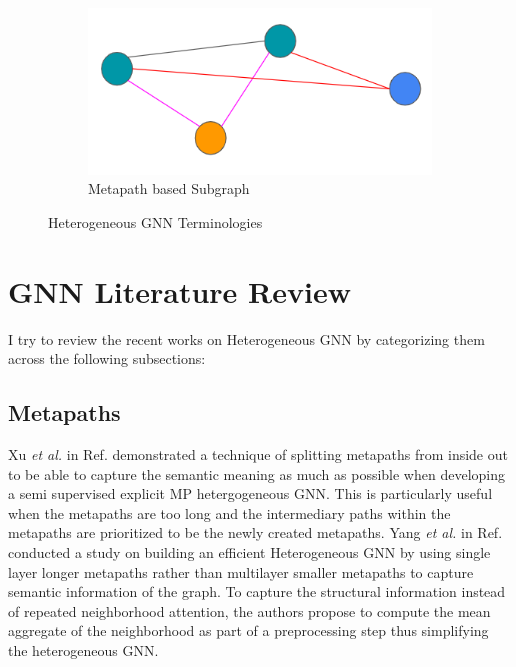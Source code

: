 \documentclass{report} %
\begin{document}
\begin{figure}[H]
    \begin{subfigure}{0.35\textwidth}
        \centering
        \includegraphics[width=\textwidth]{./ReportImages/Metasubgraph.png}
        \caption{Metapath based Subgraph}
        \label{fig:Metasubgraph}
    \end{subfigure}
    \caption{Heterogeneous \ac{GNN} Terminologies}
    \label{fig:Heterogeneous GNN Terminologies}
\end{figure}

\section{GNN Literature Review}\label{sec:HGNN Literature Review}
I try to review the recent works on Heterogeneous \ac{GNN} by categorizing them across the following subsections:

\subsection{Metapaths}\label{subsec:HGNN Metapaths}
Xu \textit{et al.} in Ref. \cite{EMPHGNN-2023} demonstrated a technique of splitting metapaths from inside out to be able to capture the semantic meaning as much as 
possible when developing a semi supervised explicit \ac{MP} hetergogeneous \ac{GNN}. This is particularly useful when the metapaths are too long and the 
intermediary paths within the metapaths are prioritized to be the newly created metapaths.
Yang \textit{et al.} in Ref. \cite{SE HGNN-2023} conducted a study on building an efficient Heterogeneous \ac{GNN} by using single layer longer metapaths rather than 
multilayer smaller metapaths to capture semantic information of the graph. To capture the structural information instead of repeated neighborhood attention, 
the authors propose to compute the mean aggregate of the neighborhood as part of a preprocessing step thus simplifying the heterogeneous \ac{GNN}. 
\end{document}
